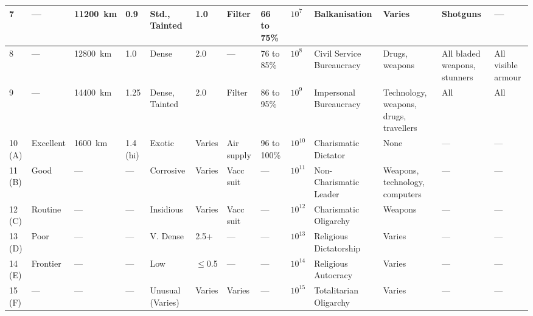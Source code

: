 \documentclass[landscape]{cheatsheet}
\begin{document}
\begin{tabularx}{\linewidth}{l|l|l|l|l|l|l|l|l|l|X|X|l}
  7      & ---       & \SI{11200}{\kilo\meter}      & 0.9       & Std., Tainted    & 1.0       & Filter             & 66 to 75\%  &  $10^{7}$ & Balkanisation & Varies & Shotguns & --- \\ \midrule
  8      & ---       & \SI{12800}{\kilo\meter}      & 1.0       & Dense            & 2.0       & ---                & 76 to 85\%  &  $10^{8}$ & Civil Service Bureaucracy & Drugs, weapons & All bladed weapons, stunners & All visible armour \\
  9      & ---       & \SI{14400}{\kilo\meter}      & 1.25      & Dense, Tainted   & 2.0       & Filter             & 86 to 95\%  &  $10^{9}$ & Impersonal Bureaucracy & Technology, weapons, drugs, travellers & All & All \\
  10 (A) & Excellent & \SI{1600}{\kilo\meter}       & 1.4 (hi)  & Exotic           & Varies    & Air supply         & 96 to 100\% & $10^{10}$ & Charismatic Dictator & None & --- & --- \\
  11 (B) & Good      & ---                          & ---       & Corrosive        & Varies    & Vacc suit          & ---         & $10^{11}$ & Non-Charismatic Leader & Weapons, technology, computers & --- & ---  \\ \midrule
  12 (C) & Routine   & ---                          & ---       & Insidious        & Varies    & Vacc suit          & ---         & $10^{12}$ & Charismatic Oligarchy & Weapons & --- & --- \\
  13 (D) & Poor      & ---                          & ---       & V. Dense         & 2.5+      & ---                & ---         & $10^{13}$ & Religious Dictatorship & Varies & --- & --- \\
  14 (E) & Frontier  & ---                          & ---       & Low              & $\leq$0.5 & ---                & ---         & $10^{14}$ & Religious Autocracy & Varies & --- & --- \\
  15 (F) & ---       & ---                          & ---       & Unusual (Varies) & Varies    & Varies             & ---         & $10^{15}$ & Totalitarian Oligarchy & Varies & --- & --- \\ \bottomrule
\end{tabularx}
\end{document}
